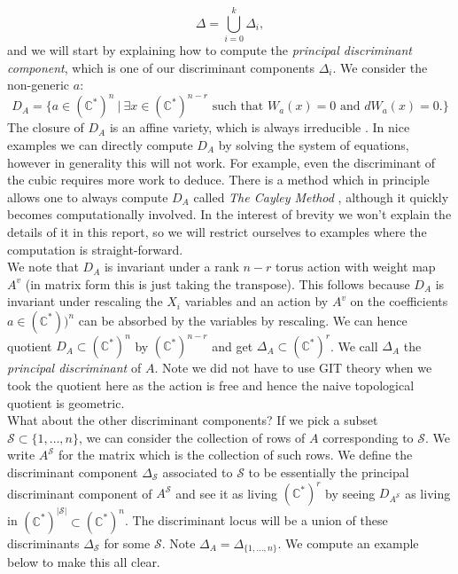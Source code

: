 \documentclass[oneside]{amsart}
\theoremstyle{definition}
\theoremstyle{definition}
\theoremstyle{definition}
\theoremstyle{definition}
\newcommand{\CC}{\mathbb{C}}
\begin{document}
$$
\Delta = \bigcup_{i=0}^k \Delta_i,
$$
and we will start by explaining how to compute the \textit{principal discriminant component}, which is one of our discriminant components $\Delta_i$. We consider the non-generic $a$:
$$
D_A= \{ a \in (\CC^*)^n \: | \: \exists x \in(\CC^*)^{n-r} \text{ such that $W_a(x) =0$ and $dW_a(x) =0.$} \}
$$
The closure of $D_A$ is an affine variety, which is always irreducible \cite[Ch. 9]{gelfand1994discriminants}. In nice examples we can directly compute $D_A$ by solving the system of equations, however in generality this will not work. For example, even the discriminant of the cubic requires more work to deduce. There is a method which in principle allows one to always compute $D_A$ called \textit{The Cayley Method} \cite[Ch. 2]{gelfand1994discriminants}, although it quickly becomes computationally involved. In the interest of brevity we won't explain the details of it in this report, so we will restrict ourselves to examples where the computation is straight-forward.\\
\newline
We note that $D_A$ is invariant under a rank $n-r$ torus action with weight map $A^v$ (in matrix form this is just taking the transpose). This follows because $D_A$ is invariant under rescaling the $X_i$ variables and an action by $A^v$ on the coefficients $a \in (\CC^*))^{n}$ can be absorbed by the variables by rescaling. We can hence quotient $D_A \subset (\CC^*)^n$ by $(\CC^*)^{n-r}$ and get $\Delta_A \subset (\CC^*)^r$. We call $\Delta_A$ the \textit{principal discriminant} of $A$. Note we did not have to use GIT theory when we took the quotient here as the action is free and hence the naive topological quotient is geometric. \\
\newline
What about the other discriminant components? If we pick a subset $\mathcal{S} \subset \{1, \dots, n \}$, we can consider the collection of rows of $A$ corresponding to $\mathcal{S}$. We write $A^{\mathcal{S}}$ for the matrix which is the collection of such rows. We define the discriminant component $\Delta_{\mathcal{S}}$ associated to $\mathcal{S}$ to be essentially the principal discriminant component of $A^{\mathcal{S}}$ and see it as living $(\CC^*)^r$ by seeing $D_{A^{\mathcal{S}}}$ as living in $(\CC^*)^{|\mathcal{S}|} \subset (\CC^*)^{n} $. The discriminant locus will be a union of these discriminants $\Delta_{\mathcal{S}}$ for some $\mathcal{S}$. Note $\Delta_A = \Delta_{\{1,\dots,n \}}$. We compute an example below to make this all clear.
\end{document}
